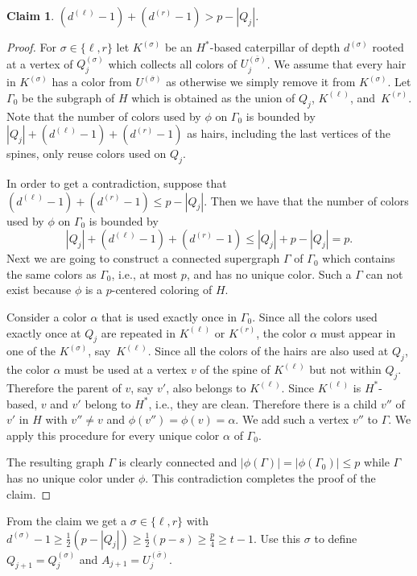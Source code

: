 \documentclass[11pt]{article}
\newtheorem*{klaim}{Claim}
\begin{document}
\begin{klaim}\label{lem:h1+h2}
  $(d^{(\ell)}-1)+(d^{(r)}-1) > p - |Q_j|$.
\end{klaim}
\begin{proof}
  For $\sigma\in\{\ell,r\}$ let $K^{(\sigma)}$ be an $H^*$-based caterpillar of depth $d^{(\sigma)}$
  rooted at a vertex of $Q_j^{(\sigma)}$ which collects all colors of
  $U_j^{(\bar{\sigma})}$.  
  We assume that every hair in $K^{(\sigma)}$ has a color from $U^{(\bar{\sigma})}$ as 
  otherwise  we simply remove it from $K^{(\sigma)}$.
  Let $\Gamma_0$ be the subgraph of $H$ which is obtained
  as the union of $Q_j$, $K^{(\ell)}$, and~$K^{(r)}$.
  Note that the number of colors used by $\phi$ on $\Gamma_0$ is bounded 
  by $|Q_j| + (d^{(\ell)}-1) + (d^{(r)}-1)$ as hairs, including the last vertices of the spines, 
  only reuse colors used on $Q_j$.

  In order to get a contradiction, suppose that $(d^{(\ell)}-1)+(d^{(r)}-1)\leq p - |Q_j|$. 
  Then we have that the number of colors used by $\phi$ on $\Gamma_0$ is bounded by 
\[
|Q_j| + (d^{(\ell)}-1) + (d^{(r)}-1) \leq |Q_j| + p - |Q_j| = p.
\]
  Next we are going to construct a connected supergraph $\Gamma$ of
  $\Gamma_0$ which contains the same colors as $\Gamma_0$, i.e., at
  most $p$, and has no unique color. Such a $\Gamma$ can not exist
  because $\phi$ is a $p$-centered coloring of $H$.

  Consider a color $\alpha$ that is used exactly once in $\Gamma_0$.
  Since all the colors used exactly once at $Q_j$ are repeated in $K^{(\ell)}$ or $K^{(r)}$,
  the color $\alpha$ must appear in one of the $K^{(\sigma)}$, say~$K^{(\ell)}$.
  Since all the colors of the hairs are also used at $Q_j$, the color $\alpha$
  must be used at a vertex $v$ of the spine of $K^{(\ell)}$ but not within $Q_j$.
  Therefore the parent of $v$, say $v'$, also belongs to $K^{(\ell)}$.
  Since $K^{(\ell)}$ is $H^*$-based, $v$ and $v'$ belong to $H^*$, i.e., they are clean.
  Therefore there is a child $v''$ of $v'$ in $H$ with $v''\neq v$ and $\phi(v'')=\phi(v)=\alpha$.
  We add such a vertex $v''$ to $\Gamma$.
  We apply this procedure for every unique color $\alpha$ of $\Gamma_0$.
  
  The resulting graph $\Gamma$ is clearly connected and $|\phi(\Gamma)| = |\phi(\Gamma_0)|\leq p$ 
  while $\Gamma$ has no unique color under $\phi$.
  This contradiction completes the proof of the claim.
\end{proof}

{}From the claim we get a  $\sigma\in\{\ell,r\}$ with
$d^{(\sigma)} -1 \geq \frac{1}{2}(p-|Q_j|) \geq \frac{1}{2}(p - s) \geq \frac{p}{4} \geq t-1$.
Use this $\sigma$ to define $Q_{j+1}= Q_j^{(\sigma)}$ and $A_{j+1} = U_j^{(\bar{\sigma})}$.
\end{document}
